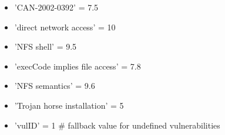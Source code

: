 \begin{itemize}
\item 'CAN-2002-0392' = 7.5
\item 'direct network access' = 10
\item 'NFS shell' = 9.5
\item 'execCode implies file access' = 7.8
\item 'NFS semantics' = 9.6
\item 'Trojan horse installation' = 5
\item 'vulID' = 1 \# fallback value for undefined vulnerabilities
\end{itemize}






